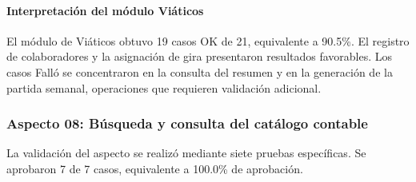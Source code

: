 \paragraph{Interpretación del módulo Viáticos}
El módulo de Viáticos obtuvo 19 casos OK de 21, equivalente a 90.5\%. El registro de colaboradores y la asignación de gira presentaron resultados favorables. Los casos Falló se concentraron en la consulta del resumen y en la generación de la partida semanal, operaciones que requieren validación adicional.

\subsubsection{Aspecto 08: Búsqueda y consulta del catálogo contable}
La validación del aspecto se realizó mediante siete pruebas específicas. Se aprobaron 7 de 7 casos, equivalente a 100.0\% de aprobación.

